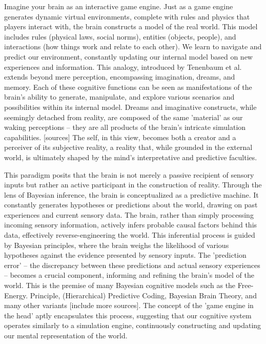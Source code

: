 Imagine your brain as an interactive game engine. Just as a game engine generates dynamic virtual environments, complete with rules and physics that players interact with, the brain constructs a model of the real world. This model includes rules (physical laws, social norms), entities (objects, people), and interactions (how things work and relate to each other). We learn to navigate and predict our environment, constantly updating our internal model based on new experiences and information.
This analogy, introduced by Tenenbaum et al. \cite{Ullman_Spelke_Battaglia_Tenenbaum_2017, Lake_Ullman_Tenenbaum_Gershman_2017, rule_child_2020} extends beyond mere perception, encompassing imagination, dreams, and memory. Each of these cognitive functions can be seen as manifestations of the brain's ability to generate, manipulate, and explore various scenarios and possibilities within its internal model. Dreams and imaginative constructs, while seemingly detached from reality, are composed of the same 'material' as our waking perceptions – they are all products of the brain's intricate simulation capabilities. [sources]
The self, in this view, becomes both a creator and a perceiver of its subjective reality, a reality that, while grounded in the external world, is ultimately shaped by the mind's interpretative and predictive faculties.

This paradigm posits that the brain is not merely a passive recipient of sensory inputs but rather an active participant in the construction of reality. Through the lens of Bayesian inference, the brain is conceptualized as a predictive machine. It constantly generates hypotheses or predictions about the world, drawing on past experiences and current sensory data. The brain, rather than simply processing incoming sensory information, actively infers probable causal factors behind this data, effectively reverse-engineering the world. This inferential process is guided by Bayesian principles, where the brain weighs the likelihood of various hypotheses against the evidence presented by sensory inputs. The 'prediction error' – the discrepancy between these predictions and actual sensory experiences – becomes a crucial component, informing and refining the brain's model of the world. This is the premise of many Bayesian cognitive models such as the Free-Energy. Principle, (Hierarchical) Predictive Coding, Bayesian Brain Theory, and many other variants \cite{friston_free-energy_2010, friston_world_2021} [include more sources].
The concept of the 'game engine in the head' aptly encapsulates this process, suggesting that our cognitive system operates similarly to a simulation engine, continuously constructing and updating our mental representation of the world.


